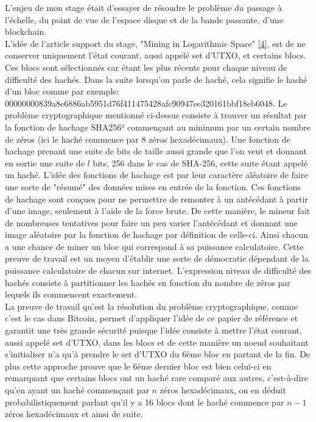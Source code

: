 \documentclass[12pt,a4paper]{article}
\newcommand{\source}[1]{\hyperlink{#1}{[#1]}}
\begin{document}
	L'enjeu de mon stage était d'essayer de résoudre le problème du passage à l'échelle, du point de vue de l'espace disque et de la bande passante, d'une blockchain.\\
	L'idée de l'article support du stage, "Mining in Logarithmic Space" \source{4}, est de ne conserver uniquement l'état courant, aussi appelé set d'UTXO, et certains blocs. Ces blocs sont sélectionnés car étant les plus récents pour chaque niveau de difficulté des hachés. Dans la suite lorsqu'on parle de haché, cela signifie le haché d'un bloc comme par exemple:\\ 00000000839a8e6886ab5951d76f411475428afc90947ee320161bbf18eb6048. Le problème cryptographique mentionné ci-dessus consiste à trouver un résultat par la fonction de hachage SHA256² commençant au minimum par un certain nombre de zéros (ici le haché commence par 8 zéros hexadécimaux). Une fonction de hachage prenant une suite de bits de taille aussi grande que l'on veut et donnant en sortie une suite de $l$ bits, 256 dans le cas de SHA-256, cette suite étant appelé un haché. L'idée des fonctions de hachage est par leur caractère aléatoire de faire une sorte de "résumé" des données mises en entrée de la fonction. Ces fonctions de hachage sont conçues pour ne permettre de remonter à un antécédant à partir d'une image, seulement à l'aide de la force brute. De cette manière, le mineur fait de nombreuses tentatives pour faire un peu varier l'antécédant et donnant une image aléatoire par la fonction de hachage par définition de celle-ci. Ainsi chacun a une chance de miner un bloc qui correspond à sa puissance calculatoire. Cette preuve de travail est un moyen d'établir une sorte de démocratie dépendant de la puissance calculatoire de chacun sur internet. L'expression niveau de difficulté des hachés consiste à partitionner les hachés en fonction du nombre de zéros par lequels ils commencent exactement.\\ %
	La preuve de travail qu'est la résolution du problème cryptographique, comme c'est le cas dans Bitcoin, permet d'appliquer l'idée de ce papier de référence et garantit une très grande sécurité puisque l'idée consiste à mettre l'état courant, aussi appelé set d'UTXO, dans les blocs et de cette manière un noeud souhaitant s'initialiser n'a qu'à prendre le set d'UTXO du 6ème bloc en partant de la fin. De plus cette approche prouve que le 6ème dernier bloc est bien celui-ci en remarquant que certains blocs ont un haché rare comparé aux autres, c'est-à-dire qu'en ayant un haché commençant par $n$ zéros hexadécimaux, on en déduit probabilistiquement parlant qu'il y a 16 blocs dont le haché commence par $n - 1$ zéros hexadécimaux et ainsi de suite.%
	
\end{document}

